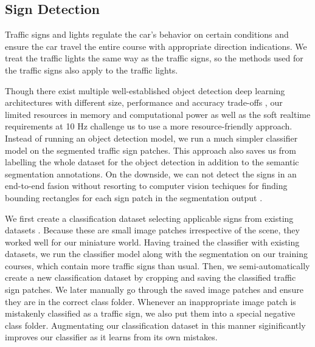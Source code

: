 \subsection{Sign Detection}

Traffic signs and lights regulate the car's behavior on certain conditions and
ensure the car travel the entire course with appropriate direction indications.
We treat the traffic lights the same way as the traffic signs, so the methods
used for the traffic signs also apply to the traffic lights.

Though there exist multiple well-established object detection deep learning
architectures with different size, performance and accuracy trade-offs
\cite{Gupta2019PerformanceCO, Rezatofighi2019GeneralizedIO}, our limited
resources in memory and computational power as well as the soft realtime
requirements at 10 Hz challenge us to use a more resource-friendly approach.
Instead of running an object detection model, we run a much simpler classifier
model on the segmented traffic sign patches. This approach also saves us from
labelling the whole dataset for the object detection in addition to the
semantic segmentation annotations. On the downside, we can not detect the signs
in an end-to-end fasion without resorting to computer vision techiques for
finding bounding rectangles for each sign patch in the segmentation output
\cite{Bradski2000CV}.

We first create a classification dataset selecting applicable signs from
existing datasets \cite{Timofte2009MultiviewTS, Stallkamp2012ManVC}. Because
these are small image patches irrespective of the scene, they worked well for
our miniature world. Having trained the classifier with existing datasets, we
run the classifier model along with the segmentation on our training courses,
which contain more traffic signs than usual. Then, we semi-automatically create
a new classification dataset by cropping and saving the classified traffic sign
patches. We later manually go through the saved image patches and ensure they
are in the correct class folder. Whenever an inappropriate image patch is
mistakenly classified as a traffic sign, we also put them into a special
negative class folder.  Augmentating our classification dataset in this manner
siginificantly improves our classifier as it learns from its own mistakes.

